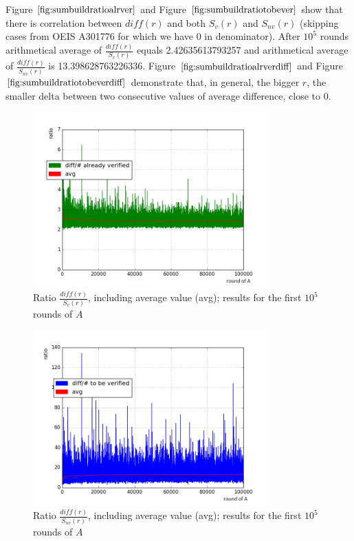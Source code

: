 \documentclass[10pt,twocolumn]{article}
\begin{document}
Figure $\ref{fig:sumbuildratioalrver}$ and Figure $\ref{fig:sumbuildratiotobever}$ show that there is correlation between $diff(r)$ and both $S_v(r)$ and $S_{nv}(r)$ (skipping cases from OEIS A301776 for which we have $0$ in denominator). After $10^5$ rounds arithmetical average of $\frac{diff(r)}{S_v(r)}$ equals 2.42635613793257 and arithmetical average of $\frac{diff(r)}{S_{nv}(r)}$ is 13.398628763226336. Figure $\ref{fig:sumbuildratioalrverdiff}$ and Figure $\ref{fig:sumbuildratiotobeverdiff}$ demonstrate that, in general, the bigger $r$, the smaller delta between two consecutive values of average difference, close to $0$.

\begin{figure}[!ht]
\centering
\captionsetup{justification=centering}
\includegraphics[width=9cm]{f_sumbuild_ratio_alr_ver}
\caption[caption]{Ratio $\frac{diff(r)}{S_v(r)}$, including average value (avg); results for the first $10^5$ rounds of $A$}
\label{fig:sumbuildratioalrver}
\end{figure}

\begin{figure}[!ht]
\centering
\captionsetup{justification=centering}
\includegraphics[width=9cm]{f_sumbuild_ratio_to_be_ver}
\caption[caption]{Ratio $\frac{diff(r)}{S_{nv}(r)}$, including average value (avg); results for the first $10^5$ rounds of $A$}
\label{fig:sumbuildratiotobever}
\end{figure}
\end{document}
